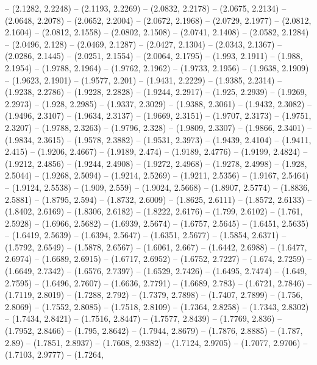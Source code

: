 {  -- (2.1282, 2.2248) -- (2.1193, 2.2269) -- (2.0832, 2.2178) -- (2.0675, 
  2.2134) -- (2.0648, 2.2078) -- (2.0652, 2.2004) -- (2.0672, 2.1968) -- 
  (2.0729, 2.1977) -- (2.0812, 2.1604) -- (2.0812, 2.1558) -- (2.0802, 2.1508) 
  -- (2.0741, 2.1408) -- (2.0582, 2.1284) -- (2.0496, 2.128) -- (2.0469, 2.1287)
   -- (2.0427, 2.1304) -- (2.0343, 2.1367) -- (2.0286, 2.1445) -- (2.0251, 
  2.1554) -- (2.0064, 2.1795) -- (1.993, 2.1911) -- (1.988, 2.1954) -- (1.9788, 
  2.1964) -- (1.9762, 2.1962) -- (1.9733, 2.1956) -- (1.9638, 2.1909) -- 
  (1.9623, 2.1901) -- (1.9577, 2.201) -- (1.9431, 2.2229) -- (1.9385, 2.2314) --
   (1.9238, 2.2786) -- (1.9228, 2.2828) -- (1.9244, 2.2917) -- (1.925, 2.2939) 
  -- (1.9269, 2.2973) -- (1.928, 2.2985) -- (1.9337, 2.3029) -- (1.9388, 2.3061)
   -- (1.9432, 2.3082) -- (1.9496, 2.3107) -- (1.9634, 2.3137) -- (1.9669, 
  2.3151) -- (1.9707, 2.3173) -- (1.9751, 2.3207) -- (1.9788, 2.3263) -- 
  (1.9796, 2.328) -- (1.9809, 2.3307) -- (1.9866, 2.3401) -- (1.9834, 2.3615) --
   (1.9578, 2.3882) -- (1.9531, 2.3973) -- (1.9439, 2.4104) -- (1.9411, 2.415) 
  -- (1.9206, 2.4667) -- (1.9189, 2.474) -- (1.9189, 2.4776) -- (1.9199, 2.4824)
   -- (1.9212, 2.4856) -- (1.9244, 2.4908) -- (1.9272, 2.4968) -- (1.9278, 
  2.4998) -- (1.928, 2.5044) -- (1.9268, 2.5094) -- (1.9214, 2.5269) -- (1.9211,
   2.5356) -- (1.9167, 2.5464) -- (1.9124, 2.5538) -- (1.909, 2.559) -- (1.9024,
   2.5668) -- (1.8907, 2.5774) -- (1.8836, 2.5881) -- (1.8795, 2.594) -- 
  (1.8732, 2.6009) -- (1.8625, 2.6111) -- (1.8572, 2.6133) -- (1.8402, 2.6169) 
  -- (1.8306, 2.6182) -- (1.8222, 2.6176) -- (1.799, 2.6102) -- (1.761, 2.5928) 
  -- (1.6966, 2.5682) -- (1.6939, 2.5674) -- (1.6757, 2.5645) -- (1.6451, 
  2.5635) -- (1.6419, 2.5639) -- (1.6394, 2.5647) -- (1.6351, 2.5677) -- 
  (1.5854, 2.6371) -- (1.5792, 2.6549) -- (1.5878, 2.6567) -- (1.6061, 2.667) --
   (1.6442, 2.6988) -- (1.6477, 2.6974) -- (1.6689, 2.6915) -- (1.6717, 2.6952) 
  -- (1.6752, 2.7227) -- (1.674, 2.7259) -- (1.6649, 2.7342) -- (1.6576, 2.7397)
   -- (1.6529, 2.7426) -- (1.6495, 2.7474) -- (1.649, 2.7595) -- (1.6496, 
  2.7607) -- (1.6636, 2.7791) -- (1.6689, 2.783) -- (1.6721, 2.7846) -- (1.7119,
   2.8019) -- (1.7288, 2.792) -- (1.7379, 2.7898) -- (1.7407, 2.7899) -- (1.756,
   2.8069) -- (1.7552, 2.8085) -- (1.7518, 2.8109) -- (1.7364, 2.8258) -- 
  (1.7343, 2.8302) -- (1.7434, 2.8421) -- (1.7516, 2.8447) -- (1.7577, 2.8439) 
  -- (1.7769, 2.836) -- (1.7952, 2.8466) -- (1.795, 2.8642) -- (1.7944, 2.8679) 
  -- (1.7876, 2.8885) -- (1.787, 2.89) -- (1.7851, 2.8937) -- (1.7608, 2.9382) 
  -- (1.7124, 2.9705) -- (1.7077, 2.9706) -- (1.7103, 2.9777) -- (1.7264, 
}
